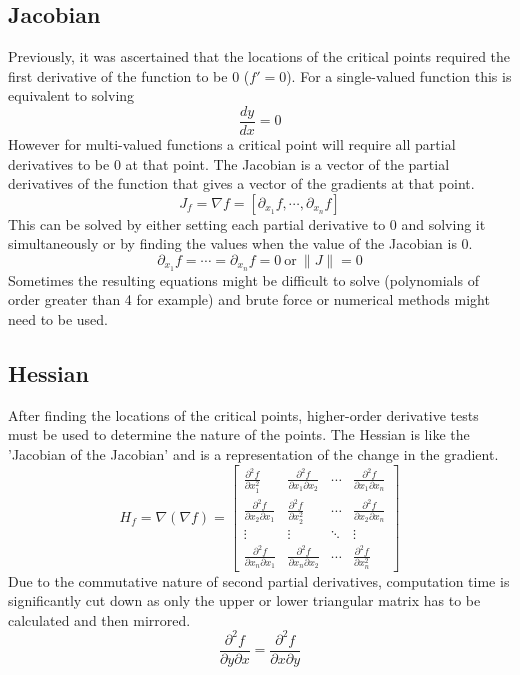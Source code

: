 \documentclass[10pt,a4paper]{report}
\begin{document}
			\subsection{Jacobian}
				Previously, it was ascertained that the locations of the critical points required the first derivative of the function to be 0 ($f' = 0$).
				For a single-valued function this is equivalent to solving \[\frac{dy}{dx} = 0\]
				However for multi-valued functions a critical point will require all partial derivatives to be 0 at that point. The Jacobian \autocite{Jacobian} is
				a vector of the partial derivatives of the function that gives a vector of the gradients at that point.
				\begin{equation}
					J_f = \nabla f = [\partial_{x_1} f, \cdots, \partial_{x_n} f]
					\label{eq:jacobian}
				\end{equation}
				This can be solved by either setting each partial derivative to 0 and solving it simultaneously or by finding the values
				when the value of the Jacobian is 0. \[\partial_{x_1} f = \cdots = \partial_{x_n} f = 0 \ \textrm{or} \ \| J \| = 0 \]
				Sometimes the resulting equations might be difficult to solve (polynomials of order greater than 4 for example) and brute force or numerical methods
				might need to be used.
			\subsection{Hessian}
				After finding the locations of the critical points, higher-order derivative tests must be used to determine the nature of the points.
				The Hessian \autocite{Hessian} is like the 'Jacobian of the Jacobian' and is a representation of the change in the gradient.
				\begin{equation}
					H_f = \nabla(\nabla f) =
						\begin{bmatrix}
							\frac{\partial^2 f}{\partial x_{1}^{2}} & \frac{\partial^2 f}{\partial x_1 \partial x_2} &\cdots & \frac{\partial^2 f}{\partial x_1 \partial x_n}\\
							\frac{\partial^2 f}{\partial x_2 \partial x_1} & \frac{\partial^2 f}{\partial x_{2}^{2}} & \cdots & \frac{\partial^2 f}{\partial x_2 \partial x_n}\\
							\vdots & \vdots  & \ddots & \vdots \\
							\frac{\partial^2 f}{\partial x_n \partial x_1} & \frac{\partial^2 f}{\partial x_n \partial x_2} & \cdots & \frac{\partial^2 f}{\partial x_{n}^{2}}
						\end{bmatrix}
					\label{eq:hessian}
				\end{equation}
				Due to the commutative nature of second partial derivatives, computation time is significantly cut down as only the upper or lower
				triangular matrix has to be calculated and then mirrored.
				\begin{equation}
					\frac{\partial^2 f}{\partial y \partial x} = \frac{\partial^2 f}{\partial x \partial y}
					\label{eq:symmetry}
				\end{equation}
\end{document}
